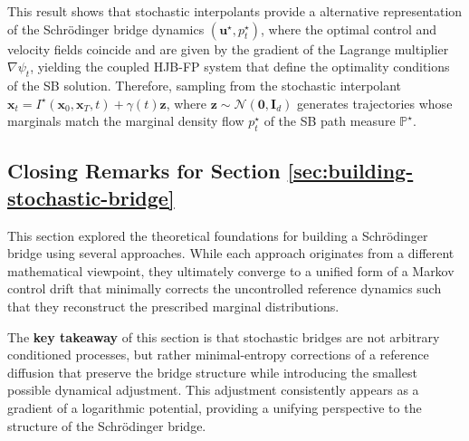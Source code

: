 \documentclass{article}
\begin{document}
This result shows that stochastic interpolants provide a alternative representation of the Schrödinger bridge dynamics $(\boldsymbol{u}^\star,p^\star_t)$, where the optimal control and velocity fields coincide and are given by the gradient of the Lagrange multiplier $\nabla\psi_t$, yielding the coupled HJB-FP system that define the optimality conditions of the SB solution. Therefore, sampling from the stochastic interpolant $\boldsymbol{x}_t=I^\star(\boldsymbol{x}_0, \boldsymbol{x}_T,t)+\gamma(t)\boldsymbol{z}$, where $\boldsymbol{z}\sim \mathcal{N}(\boldsymbol{0},\boldsymbol{I}_d)$ generates trajectories whose marginals match the marginal density flow $p_t^\star$ of the SB path measure $\mathbb{P}^\star$.

\subsection{Closing Remarks for Section \ref{sec:building-stochastic-bridge}}
This section explored the theoretical foundations for building a Schrödinger bridge using several approaches. While each approach originates from a different mathematical viewpoint, they ultimately converge to a unified form of a Markov control drift that minimally corrects the uncontrolled reference dynamics such that they reconstruct the prescribed marginal distributions.

The \textbf{key takeaway} of this section is that stochastic bridges are not arbitrary conditioned processes, but rather minimal-entropy corrections of a reference diffusion that preserve the bridge structure while introducing the smallest possible dynamical adjustment. This adjustment consistently appears as a gradient of a logarithmic potential, providing a unifying perspective to the structure of the Schrödinger bridge.
\end{document}
